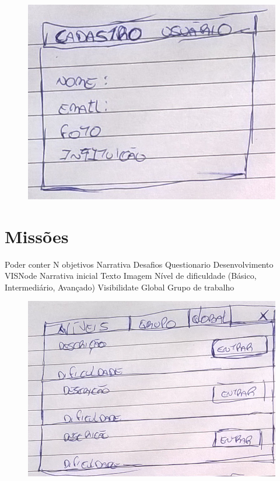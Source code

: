 \documentclass[
	12pt,				%
	oneside,			%
	a4paper,			%
	english,			%
	french,				%
	spanish,			%
	brazil,				%
	]{abntex2}
\begin{document}
\begin{figure}[ht]
\centering
\includegraphics[width=1\textwidth]{imagens/proposta_cadastro_usuario.png}
\end{figure}

\section{Missões}

Poder conter N objetivos
Narrativa
Desafios
Questionario
Desenvolvimento VISNode
Narrativa inicial
Texto
Imagem
Nível de dificuldade (Básico, Intermediário, Avançado)
Visibilidate
Global
Grupo de trabalho

\begin{figure}[ht]
\centering
\includegraphics[width=1\textwidth]{imagens/proposta_niveis.png}
\end{figure}
\end{document}

